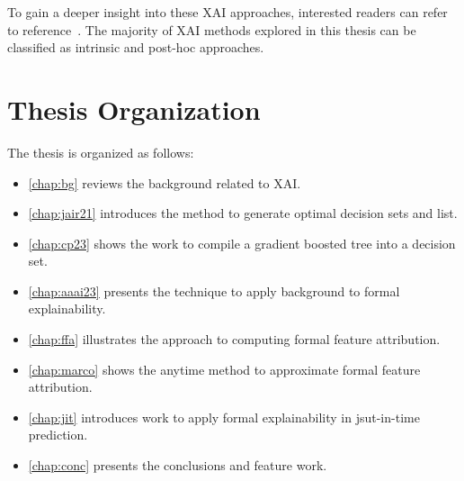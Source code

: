 To gain a deeper insight into these XAI approaches, interested readers can refer to
reference~\cite{asjaa-dmkd21,molnar-bk20,rai-jams20,darwiche-lics23,xudfzz-nlpcc19,hsmbs-xxai22,ignatiev-ijcai20,ms-rw22,msi-fai23}.
%
The majority of XAI methods explored in this thesis can be classified as intrinsic
and post-hoc approaches.





\section{Thesis Organization} \label{sec:structure}
The thesis is organized as follows:
\begin{itemize}
	\item \autoref{chap:bg} reviews the background related to XAI.
	\item \autoref{chap:jair21} introduces the method to generate optimal decision sets and list.
	\item \autoref{chap:cp23} shows the work to compile a gradient boosted tree into a
		decision set.
	\item \autoref{chap:aaai23} presents the technique to apply background to formal
		explainability.
	\item \autoref{chap:ffa}  illustrates the approach to computing formal feature attribution.
	\item \autoref{chap:marco}  shows the anytime method to approximate formal feature
		attribution.
	\item \autoref{chap:jit} introduces work to apply formal explainability in jsut-in-time
		prediction.
	\item \autoref{chap:conc} presents the conclusions and feature work.
\end{itemize}

